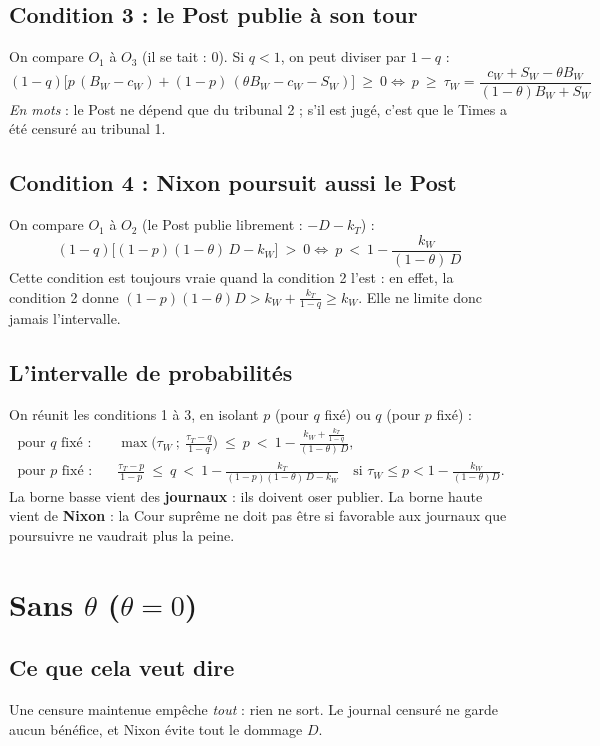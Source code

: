 \documentclass[11pt,a4paper]{article}
\theoremstyle{definition}
\begin{document}
\subsection{Condition 3 : le Post publie à son tour}
On compare $O_1$ à $O_3$ (il se tait : $0$). Si $q<1$, on peut diviser par $1-q$ :
\[
(1-q)\big[p\,(B_W-c_W)+(1-p)\,(\theta B_W-c_W-S_W)\big]\ \ge\ 0
\iff
\boxed{\ p\ \ge\ \tau_W=\frac{c_W+S_W-\theta B_W}{(1-\theta)B_W+S_W}\ }
\]
\textit{En mots} : le Post ne dépend que du tribunal 2 ; s'il est jugé, c'est que le Times a été censuré au tribunal 1.

\subsection{Condition 4 : Nixon poursuit aussi le Post}
On compare $O_1$ à $O_2$ (le Post publie librement : $-D-k_T$) :
\[
(1-q)\big[(1-p)(1-\theta)\,D-k_W\big]\ >\ 0
\iff
\boxed{\ p\ <\ 1-\frac{k_W}{(1-\theta)\,D}\ }
\]
Cette condition est toujours vraie quand la condition 2 l'est : en effet, la condition 2 donne $(1-p)(1-\theta)D>k_W+\frac{k_T}{1-q}\ge k_W$. Elle ne limite donc jamais l'intervalle.

\subsection{L'intervalle de probabilités}
On réunit les conditions 1 à 3, en isolant $p$ (pour $q$ fixé) ou $q$ (pour $p$ fixé) :
\begin{align}
\text{pour } q \text{ fixé :}\quad & \max\!\Big(\tau_W\ ;\ \frac{\tau_T-q}{1-q}\Big)\ \le\ p\ <\ 1-\frac{k_W+\frac{k_T}{1-q}}{(1-\theta)\,D},\label{eq:p}\\[4pt]
\text{pour } p \text{ fixé :}\quad & \frac{\tau_T-p}{1-p}\ \le\ q\ <\ 1-\frac{k_T}{(1-p)(1-\theta)\,D-k_W}\quad\text{si } \tau_W\le p<1-\frac{k_W}{(1-\theta)D}.\label{eq:q}
\end{align}
La borne basse vient des \textbf{journaux} : ils doivent oser publier. La borne haute vient de \textbf{Nixon} : la Cour suprême ne doit pas être si favorable aux journaux que poursuivre ne vaudrait plus la peine.

\section{Sans \texorpdfstring{$\theta$}{theta} (\texorpdfstring{$\theta=0$}{theta = 0})}

\subsection{Ce que cela veut dire}
Une censure maintenue empêche \emph{tout} : rien ne sort. Le journal censuré ne garde aucun bénéfice, et Nixon évite tout le dommage $D$.
\end{document}
